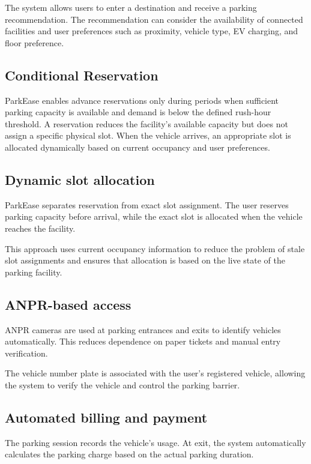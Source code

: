 \documentclass[12pt,a4paper]{article}
\begin{document}
\begin{enumerate}
The system allows users to enter a destination and receive a parking recommendation. The recommendation can consider the availability of connected facilities and user preferences such as proximity, vehicle type, EV charging, and floor preference.

\subsection{Conditional Reservation}

 ParkEase enables advance reservations only during periods when sufficient parking capacity is available and demand is below the defined rush-hour threshold. A reservation reduces the facility's available capacity but does not assign a specific physical slot. When the vehicle arrives, an appropriate slot is allocated dynamically based on current occupancy and user preferences.
 
\subsection{Dynamic slot allocation}

ParkEase separates reservation from exact slot assignment. The user reserves parking capacity before arrival, while the exact slot is allocated when the vehicle reaches the facility.

This approach uses current occupancy information to reduce the problem of stale slot assignments and ensures that allocation is based on the live state of the parking facility.

\subsection{ANPR-based access}

ANPR cameras are used at parking entrances and exits to identify vehicles automatically. This reduces dependence on paper tickets and manual entry verification.

The vehicle number plate is associated with the user's registered vehicle, allowing the system to verify the vehicle and control the parking barrier.

\subsection{Automated billing and payment}

The parking session records the vehicle's usage. At exit, the system automatically calculates the parking charge based on the actual parking duration.


\end{enumerate}
\end{document}
